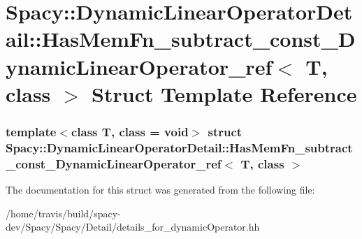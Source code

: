 \hypertarget{structSpacy_1_1DynamicLinearOperatorDetail_1_1HasMemFn__subtract__const__DynamicLinearOperator__ref}{\section{\-Spacy\-:\-:\-Dynamic\-Linear\-Operator\-Detail\-:\-:\-Has\-Mem\-Fn\-\_\-subtract\-\_\-const\-\_\-\-Dynamic\-Linear\-Operator\-\_\-ref$<$ \-T, class $>$ \-Struct \-Template \-Reference}
\label{structSpacy_1_1DynamicLinearOperatorDetail_1_1HasMemFn__subtract__const__DynamicLinearOperator__ref}
}
\subsubsection*{template$<$class T, class = void$>$ struct Spacy\-::\-Dynamic\-Linear\-Operator\-Detail\-::\-Has\-Mem\-Fn\-\_\-subtract\-\_\-const\-\_\-\-Dynamic\-Linear\-Operator\-\_\-ref$<$ T, class $>$}



\-The documentation for this struct was generated from the following file\-:\begin{DoxyCompactItemize}
\item 
/home/travis/build/spacy-\/dev/\-Spacy/\-Spacy/\-Detail/details\-\_\-for\-\_\-dynamic\-Operator.\-hh\end{DoxyCompactItemize}
